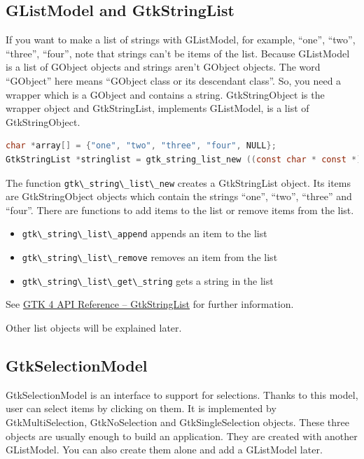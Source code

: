 \subsection{GListModel and
GtkStringList}\label{glistmodel-and-gtkstringlist}

If you want to make a list of strings with GListModel, for example,
``one'', ``two'', ``three'', ``four'', note that strings can't be items
of the list. Because GListModel is a list of GObject objects and strings
aren't GObject objects. The word ``GObject'' here means ``GObject class
or its descendant class''. So, you need a wrapper which is a GObject and
contains a string. GtkStringObject is the wrapper object and
GtkStringList, implements GListModel, is a list of GtkStringObject.

\begin{lstlisting}[language=C]
char *array[] = {"one", "two", "three", "four", NULL};
GtkStringList *stringlist = gtk_string_list_new ((const char * const *) array);
\end{lstlisting}

The function \passthrough{\lstinline!gtk\_string\_list\_new!} creates a
GtkStringList object. Its items are GtkStringObject objects which
contain the strings ``one'', ``two'', ``three'' and ``four''. There are
functions to add items to the list or remove items from the list.

\begin{itemize}
\tightlist
\item
  \passthrough{\lstinline!gtk\_string\_list\_append!} appends an item to
  the list
\item
  \passthrough{\lstinline!gtk\_string\_list\_remove!} removes an item
  from the list
\item
  \passthrough{\lstinline!gtk\_string\_list\_get\_string!} gets a string
  in the list
\end{itemize}

See \href{https://docs.gtk.org/gtk4/class.StringList.html}{GTK 4 API
Reference -- GtkStringList} for further information.

Other list objects will be explained later.

\subsection{GtkSelectionModel}\label{gtkselectionmodel}

GtkSelectionModel is an interface to support for selections. Thanks to
this model, user can select items by clicking on them. It is implemented
by GtkMultiSelection, GtkNoSelection and GtkSingleSelection objects.
These three objects are usually enough to build an application. They are
created with another GListModel. You can also create them alone and add
a GListModel later.

